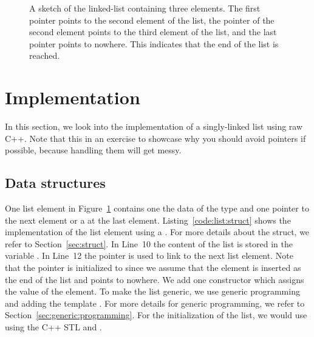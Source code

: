 \begin{figure}[tbp]
\centering
{}
\caption{A sketch of the linked-list containing three elements. The first pointer points to the second element of the list, the pointer of the second element points to the third element of the list, and the last pointer points to nowhere. This indicates that the end of the list is reached.}
\label{fig:sketch:linked:list}
\end{figure}




\chapter{Implementation}
In this section, we look into the implementation of a singly-linked list using raw C++. Note that this in an exercise to showcase why you should avoid pointers if possible, because handling them will get messy. 

\section*{Data structures}
One list element in Figure~\ref{fig:sketch:linked:list} contains one the data of the type  and one pointer to the next element or a  at the last element. Listing~\ref{code:list:struct} shows the implementation of the list element using a . For more details about the struct, we refer to Section~\ref{sec:struct}. In Line~10 the content of the list is stored in the variable . In Line~12 the pointer  is used to link to the next list element. Note that the pointer is initialized to  since we assume that the element is inserted as the end of the list and points to nowhere. We add one constructor which assigns the value of the element. To make the list generic, we use generic programming and adding the template . For more details for generic programming, we refer to Section~\ref{sec:generic:programming}. For the initialization of the list, we would use  using the C++ STL and .\\

